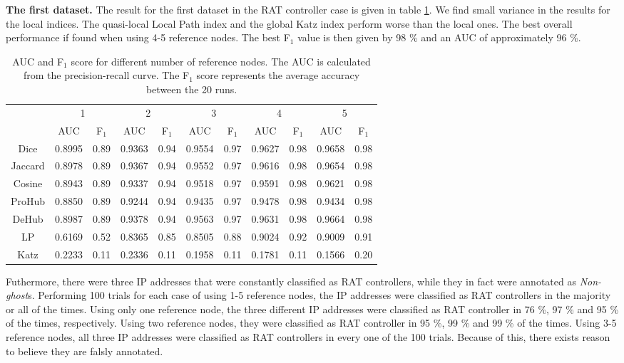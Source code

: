 \textbf{The first dataset.} The result for the first dataset in the RAT controller case is given in table \ref{aucIndex}. We find small variance in the results for the local indices. The quasi-local Local Path index and the global Katz index perform worse than the local ones. The best overall performance if found when using 4-5 reference nodes. The best F$_1$ value is then given by 98 \% and an AUC of approximately 96 \%. 

\begin{table}[h!]
    \centering
    \caption{AUC and F$_1$ score for different number of reference nodes. The AUC is calculated from the precision-recall curve. The F$_1$ score represents the average accuracy between the 20 runs.}
    \begin{tabular}{|c||c|c||c|c||c|c||c|c||c|c|}
      \hline
      \multirow{2}{*}{~} 
            & \multicolumn{2}{c||}{1}
            & \multicolumn{2}{c||}{2}
            & \multicolumn{2}{c||}{3}
            & \multicolumn{2}{c||}{4}
            & \multicolumn{2}{|c|}{5} \\             \cline{2-11}
      ~     &AUC&F$_1$&AUC&F$_1$&AUC&F$_1$&AUC&F$_1$&AUC&F$_1$ \\ \hline
    Dice    &0.8995 & 0.89 & 0.9363 &0.94 &0.9554&0.97 & 0.9627 &0.98&0.9658 & 0.98 \\
    Jaccard &0.8978 & 0.89 & 0.9367 &0.94 &0.9552&0.97 & 0.9616 &0.98&0.9654 & 0.98 \\
    Cosine  &0.8943 & 0.89 & 0.9337 &0.94 &0.9518&0.97 & 0.9591 &0.98&0.9621 & 0.98 \\
    ProHub  &0.8850 & 0.89 & 0.9244 &0.94 &0.9435&0.97 & 0.9478 &0.98&0.9434 & 0.98 \\
    DeHub   &0.8987 & 0.89 & 0.9378 &0.94 &0.9563&0.97 & 0.9631 &0.98&0.9664 & 0.98 \\
    LP      &0.6169 & 0.52 & 0.8365 & 0.85 & 0.8505 & 0.88 & 0.9024 & 0.92 & 0.9009 & 0.91 \\ 
    Katz    &0.2233 & 0.11 & 0.2336 & 0.11 & 0.1958 & 0.11 & 0.1781 & 0.11 & 0.1566 & 0.20 \\ \hline
    \end{tabular}
    \label{aucIndex}
\end{table}

Futhermore, there were three IP addresses that were constantly classified as RAT controllers, while they in fact were annotated as \textit{Non-ghost}s. Performing 100 trials for each case of using 1-5 reference nodes, the IP addresses were classified as RAT controllers in the majority or all of the times. Using only one reference node, the three different IP addresses were classified as RAT controller in 76 \%, 97 \% and 95 \% of the times, respectively. Using two reference nodes, they were classified as RAT controller in 95 \%, 99 \% and 99 \% of the times. Using 3-5 reference nodes, all three IP addresses were classified as RAT controllers in every one of the 100 trials. Because of this, there exists reason to believe they are falsly annotated. 

